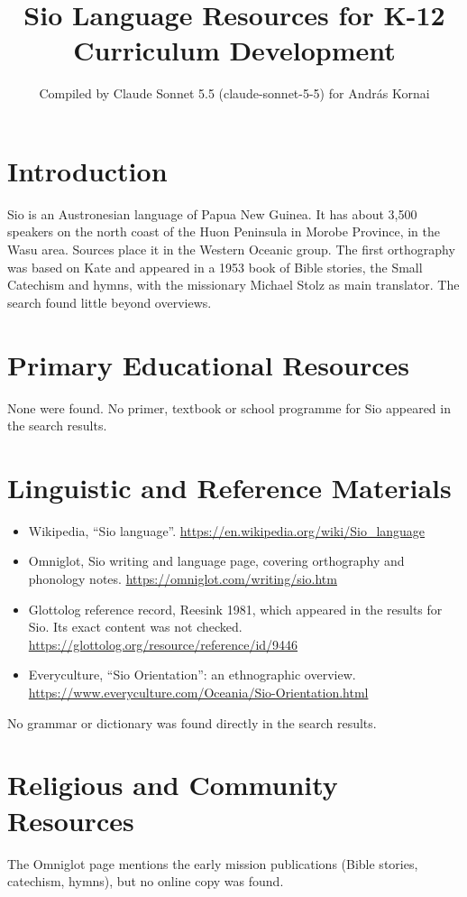 \documentclass[12pt]{article}
\title{Sio Language Resources for K-12 Curriculum Development}
\author{Compiled by Claude Sonnet 5.5 (claude-sonnet-5-5) for Andr\'as Kornai}
\date{}
\begin{document}
\maketitle

\section{Introduction}
Sio is an Austronesian language of Papua New Guinea. It has about 3,500 speakers on the north coast of the Huon Peninsula in Morobe Province, in the Wasu area. Sources place it in the Western Oceanic group. The first orthography was based on Kate and appeared in a 1953 book of Bible stories, the Small Catechism and hymns, with the missionary Michael Stolz as main translator. The search found little beyond overviews.

\section{Primary Educational Resources}
None were found. No primer, textbook or school programme for Sio appeared in the search results.

\section{Linguistic and Reference Materials}
\begin{itemize}
\item Wikipedia, ``Sio language''. \url{https://en.wikipedia.org/wiki/Sio_language}
\item Omniglot, Sio writing and language page, covering orthography and phonology notes. \url{https://omniglot.com/writing/sio.htm}
\item Glottolog reference record, Reesink 1981, which appeared in the results for Sio. Its exact content was not checked. \url{https://glottolog.org/resource/reference/id/9446}
\item Everyculture, ``Sio Orientation'': an ethnographic overview. \url{https://www.everyculture.com/Oceania/Sio-Orientation.html}
\end{itemize}
No grammar or dictionary was found directly in the search results.

\section{Religious and Community Resources}
The Omniglot page mentions the early mission publications (Bible stories, catechism, hymns), but no online copy was found.
\end{document}
